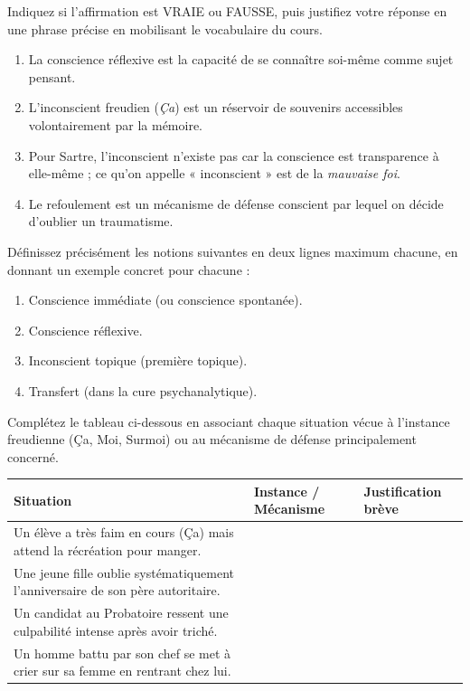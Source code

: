\documentclass[11pt]{article}
\newcommand{\cle}[1]{{\popxbold\color{popdark}#1}}
\begin{document}
\begin{exercice}
Indiquez si l'affirmation est VRAIE ou FAUSSE, puis justifiez votre réponse en une phrase précise en mobilisant le vocabulaire du cours.
\begin{enumerate}
    \item La conscience réflexive est la capacité de se connaître soi-même comme sujet pensant.
    \item L'inconscient freudien (\emph{Ça}) est un réservoir de souvenirs accessibles volontairement par la mémoire.
    \item Pour Sartre, l'inconscient n'existe pas car la conscience est transparence à elle-même ; ce qu'on appelle « inconscient » est de la \emph{mauvaise foi}.
    \item Le refoulement est un mécanisme de défense conscient par lequel on décide d'oublier un traumatisme.
\end{enumerate}
\end{exercice}

\begin{exercice}
Définissez précisément les notions suivantes en deux lignes maximum chacune, en donnant un exemple concret pour chacune :
\begin{enumerate}
    \item \cle{Conscience immédiate} (ou conscience spontanée).
    \item \cle{Conscience réflexive}.
    \item \cle{Inconscient topique} (premi\`ere topique).
    \item \cle{Transfert} (dans la cure psychanalytique).
\end{enumerate}
\end{exercice}

\begin{exercice}
Complétez le tableau ci-dessous en associant chaque situation vécue à l'instance freudienne (Ça, Moi, Surmoi) ou au mécanisme de défense principalement concerné.

\begin{center}
\begin{tabularx}{\linewidth}{|l|X|X|}\hline
\textbf{Situation} & \textbf{Instance / Mécanisme} & \textbf{Justification brève} \\ \hline
Un élève a très faim en cours (Ça) mais attend la récréation pour manger. &  &  \\ \hline
Une jeune fille oublie systématiquement l'anniversaire de son père autoritaire. &  &  \\ \hline
Un candidat au Probatoire ressent une culpabilité intense après avoir triché. &  &  \\ \hline
Un homme battu par son chef se met à crier sur sa femme en rentrant chez lui. &  &  \\ \hline
\end{tabularx}
\end{center}
\end{exercice}
\end{document}
